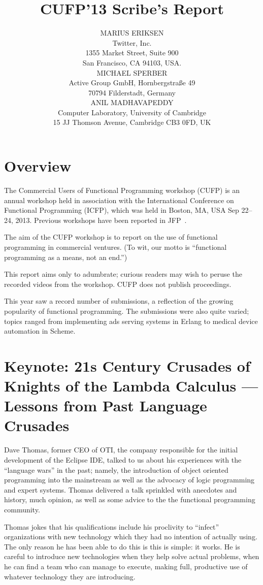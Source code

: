 \documentclass{jfp1}
\title{CUFP'13 Scribe's Report}
\author[Marius Eriksen, Michael Sperber and Anil Madhavapeddy]
       {MARIUS ERIKSEN\\
        Twitter, Inc.\\
        1355 Market Street, Suite 900 \\
        San Francisco, CA 94103, USA.\\
        MICHAEL SPERBER\\
         Active Group GmbH, Hornbergstra\ss{}e 49\\
         70794 Filderstadt, Germany\\
         ANIL MADHAVAPEDDY\\
        Computer Laboratory, University of Cambridge\\ 
        15 JJ Thomson Avenue, Cambridge CB3 0FD, UK}
\begin{document}
\maketitle

\tableofcontents

\section{Overview}

The Commercial Users of Functional Programming workshop (CUFP) is an
annual workshop held in association with the International Conference
on Functional Programming (ICFP), which was held in Boston, MA, USA
Sep 22--24, 2013. Previous workshops have been reported in JFP~\cite{JFP:9147276,JFP:8514633}.

The aim of the CUFP workshop is to report on the use of functional
programming in commercial ventures. (To wit, our motto is ``functional
programming as a means, not an end.'')

This report aims only to adumbrate; curious readers may wish to peruse
the recorded videos from the workshop. CUFP does not
publish proceedings.

This year saw a record number of submissions, a reflection of the
growing popularity of functional programming. The submissions were
also quite varied; topics ranged from implementing ads serving systems
in Erlang to medical device automation in Scheme.

\section{Keynote: 21s Century Crusades of Knights of the Lambda
Calculus — Lessons from Past Language Crusades}

Dave Thomas, former CEO of OTI, the company responsible for the
initial development of the Eclipse IDE, talked to us about his
experiences with the ``language wars'' in the past; namely, the
introduction of object oriented programming into the mainstream as
well as the advocacy of logic programming and expert systems. Thomas
delivered a talk sprinkled with anecdotes and history, much opinion,
as well as some advice to the the functional programming community.


Thomas jokes that his qualifications include his proclivity to
``infect'' organizations with new technology which they had no
intention of actually using. The only reason he has been able to do
this is this is simple: it works. He is careful to introduce new
technologies when they help solve actual problems, when he can find a
team who can manage to execute, making full, productive use of
whatever technology they are introducing.
\end{document}

